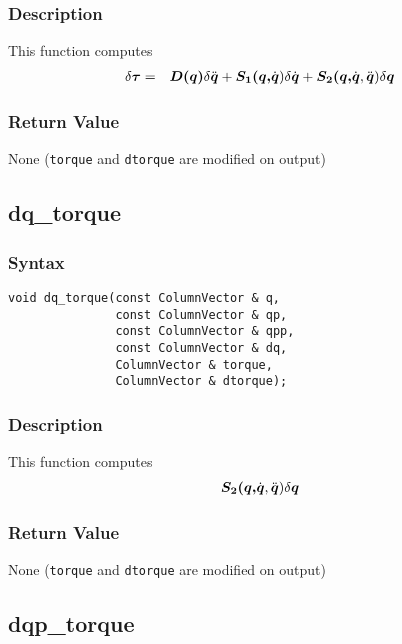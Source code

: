 \documentclass[11pt,fleqn,letterpaper]{report}
\newcommand{\mbold}[1]{\mbox{\boldmath $ #1 $}}
\begin{document}
\subsubsection*{Description}
This function computes 
\begin{eqnarray}
\delta \mbold{\tau} & = & \mbold{D(q)} \delta \ddot{\mbold{q}} 
+ \mbold{S_1(q,}\dot{\mbold{q}}) \delta \dot{\mbold{q}}
+ \mbold{S_2(q,}\dot{\mbold{q}},\ddot{\mbold{q}}) \delta \mbold{q}
\end{eqnarray}


\subsubsection*{Return Value}

None ({\tt torque} and {\tt dtorque} are modified on output)

\newpage

\subsection*{dq\_torque}
\subsubsection*{Syntax}
\begin{verbatim}
void dq_torque(const ColumnVector & q, 
               const ColumnVector & qp,
               const ColumnVector & qpp, 
               const ColumnVector & dq,
               ColumnVector & torque, 
               ColumnVector & dtorque);
\end{verbatim}
\subsubsection*{Description}
This function computes 
\begin{eqnarray}
\mbold{S_2(q,}\dot{\mbold{q}},\ddot{\mbold{q}}) \delta \mbold{q}
\end{eqnarray}


\subsubsection*{Return Value}

None ({\tt torque} and {\tt dtorque} are modified on output)

\newpage
\subsection*{dqp\_torque}
\end{document}
